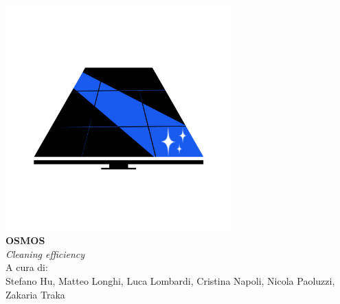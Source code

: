 \documentclass[a4paper, 12pt]{article}
\begin{document}
	
	\linespread{1}
	
	
	\vspace{4cm}
	\begin{center}
		\includegraphics[width=0.65\textwidth]{Images/LogoGIP.png}\\
		{\Huge \textbf{OSMOS}}\\
		\vspace{0.3cm}
		{\large \emph{Cleaning efficiency}}\\
		\vspace{2cm}
		A cura di:\\
		Stefano Hu, Matteo Longhi, Luca Lombardi, Cristina Napoli, Nicola Paoluzzi, Zakaria Traka
	\end{center}
	\newpage
	
	\hypersetup{hidelinks}
	\tableofcontents
	\newpage
	
\end{document}
